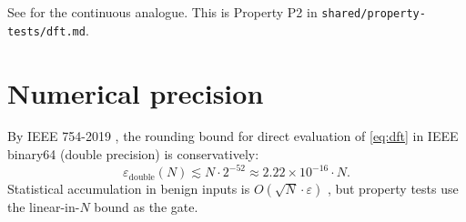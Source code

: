 \documentclass[11pt,a4paper]{article}
\theoremstyle{definition}
\theoremstyle{plain}
\begin{document}
See \cite[§7.2]{Folland1992} for the continuous analogue. This is Property P2 in
\texttt{shared/property-tests/dft.md}.

\section{Numerical precision}

By IEEE 754-2019 \cite{IEEE754_2019}, the rounding bound for direct evaluation
of \eqref{eq:dft} in IEEE binary64 (double precision) is conservatively:
\begin{equation}
\varepsilon_{\mathrm{double}}(N) \lesssim N \cdot 2^{-52} \approx 2.22 \times 10^{-16} \cdot N.
\end{equation}
Statistical accumulation in benign inputs is $O(\sqrt{N} \cdot \varepsilon)$
\cite[§12.1]{NumRec3rd}, but property tests use the linear-in-$N$ bound as
the gate.

\printbibliography
\end{document}
